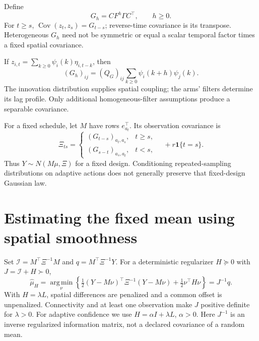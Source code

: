 \documentclass[11pt]{article}
\newcommand{\Cov}{\operatorname{Cov}}
\newcommand{\argmin}{\operatorname*{arg\,min}}
\newcommand{\one}{\mathbf1}
\begin{document}
Define
\begin{equation}
G_h=CF^h\Gamma C^\top,\qquad h\ge0.
\label{eq:lags}
\end{equation}
For $t\ge s$, $\Cov(z_t,z_s)=G_{t-s}$; reverse-time covariance is its transpose. Heterogeneous $G_h$ need not be symmetric or equal a scalar temporal factor times a fixed spatial covariance.

If $z_{i,t}=\sum_{k\ge0}\psi_i(k)\eta_{i,t-k}$, then
\begin{equation}
\boxed{(G_h)_{ij}=(Q_G)_{ij}\sum_{k\ge0}\psi_i(k+h)\psi_j(k).}
\label{eq:impulses}
\end{equation}
The innovation distribution supplies spatial coupling; the arms' filters determine its lag profile. Only additional homogeneous-filter assumptions produce a separable covariance.

For a fixed schedule, let $M$ have rows $e_{a_t}^\top$. Its observation covariance is
\begin{equation}
\Xi_{ts}=
\begin{cases}
(G_{t-s})_{a_t,a_s},&t\ge s,\\
(G_{s-t})_{a_s,a_t},&t<s,
\end{cases}
\quad{}+r\one\{t=s\}.
\label{eq:xi}
\end{equation}
Thus $Y\sim N(M\mu,\Xi)$ for a fixed design. Conditioning repeated-sampling distributions on adaptive actions does not generally preserve that fixed-design Gaussian law.

\section{Estimating the fixed mean using spatial smoothness}
Set $\mathcal I=M^\top\Xi^{-1}M$ and $q=M^\top\Xi^{-1}Y$. For a deterministic regularizer $H\succeq0$ with $J=\mathcal I+H\succ0$,
\begin{equation}
\boxed{\widehat\mu_H
=\argmin_\nu\left\{\tfrac12(Y-M\nu)^\top\Xi^{-1}(Y-M\nu)
+\tfrac12\nu^\top H\nu\right\}=J^{-1}q.}
\label{eq:ridge}
\end{equation}
With $H=\lambda L$, spatial differences are penalized and a common offset is unpenalized. Connectivity and at least one observation make $J$ positive definite for $\lambda>0$. For adaptive confidence we use $H=\alpha I+\lambda L$, $\alpha>0$. Here $J^{-1}$ is an inverse regularized information matrix, not a declared covariance of a random mean.
\end{document}
